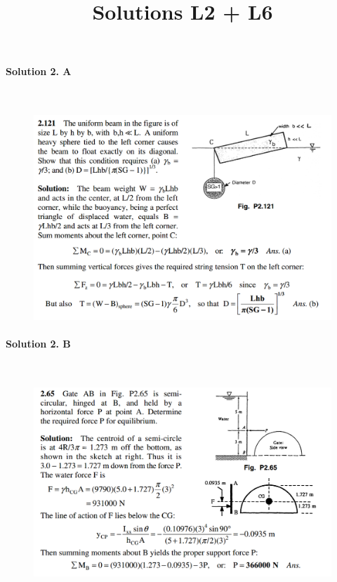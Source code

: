 \documentclass[a4paper]{article}
\title{Solutions L2 + L6}
\author{}
\date{}
\begin{document}
\maketitle

\paragraph{Solution 2. A}\hfill \\
\begin{figure}[h]
	\centering
	\includegraphics[width=1\linewidth]{"figs/solution 2A"}
	\label{fig:solution-2}
\end{figure}


\newpage
\paragraph{Solution 2. B}\hfill \\
\begin{figure}[h]
	\centering
	\includegraphics[width=1\linewidth]{"figs/solution 2B"}
	\label{fig:solution-2}
\end{figure}
\end{document}
